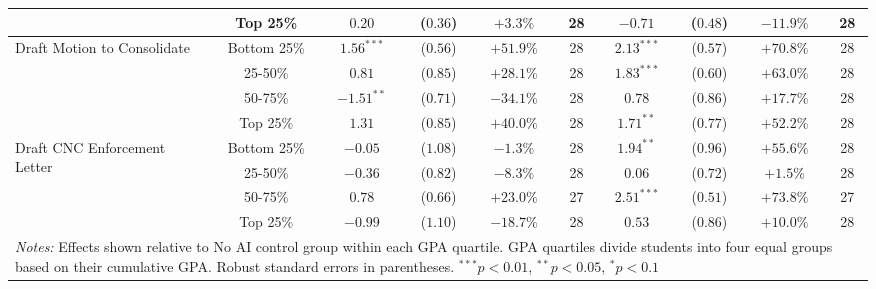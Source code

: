\begin{table}[!htbp]
\begin{tabular}{lccccccccc}
& Top 25\% & $0.20$ & ($0.36$) & $+3.3\%$ & 28 & $-0.71$ & ($0.48$) & $-11.9\%$ & 28 \\
\hline
\multirow{4}{*}{Draft Motion to Consolidate} & Bottom 25\% & $1.56^{***}$ & ($0.56$) & $+51.9\%$ & 28 & $2.13^{***}$ & ($0.57$) & $+70.8\%$ & 28 \\
& 25-50\% & $0.81$ & ($0.85$) & $+28.1\%$ & 28 & $1.83^{***}$ & ($0.60$) & $+63.0\%$ & 28 \\
& 50-75\% & $-1.51^{**}$ & ($0.71$) & $-34.1\%$ & 28 & $0.78$ & ($0.86$) & $+17.7\%$ & 28 \\
& Top 25\% & $1.31$ & ($0.85$) & $+40.0\%$ & 28 & $1.71^{**}$ & ($0.77$) & $+52.2\%$ & 28 \\
\hline
\multirow{4}{*}{Draft CNC Enforcement Letter} & Bottom 25\% & $-0.05$ & ($1.08$) & $-1.3\%$ & 28 & $1.94^{**}$ & ($0.96$) & $+55.6\%$ & 28 \\
& 25-50\% & $-0.36$ & ($0.82$) & $-8.3\%$ & 28 & $0.06$ & ($0.72$) & $+1.5\%$ & 28 \\
& 50-75\% & $0.78$ & ($0.66$) & $+23.0\%$ & 27 & $2.51^{***}$ & ($0.51$) & $+73.8\%$ & 27 \\
& Top 25\% & $-0.99$ & ($1.10$) & $-18.7\%$ & 28 & $0.53$ & ($0.86$) & $+10.0\%$ & 28 \\
\hline
\multicolumn{10}{p{0.95\linewidth}}{\footnotesize \textit{Notes:} Effects shown relative to No AI control group within each GPA quartile. GPA quartiles divide students into four equal groups based on their cumulative GPA. Robust standard errors in parentheses. $^{***}p<0.01$, $^{**}p<0.05$, $^{*}p<0.1$}
\end{tabular}
\end{table}
